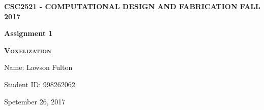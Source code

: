 \documentclass {article}
\begin{document}
	
	
	
	
	
	
	
	
	
	
	
	
	\begin{center}
		\Large
		
		\textbf{\MakeUppercase{CSC2521 - Computational Design and Fabrication Fall 2017}}
		\vfill  
		
		{
			\Huge
			\textbf{Assignment 1}
		}
		
		{
			\Large
			\textsc{\textbf{Voxelization}}
		}
		
		\vfill
		Name: Lawson Fulton
		
		Student ID: 998262062
		
		Spetember 26, 2017
	\end{center}
	
\end{document}
